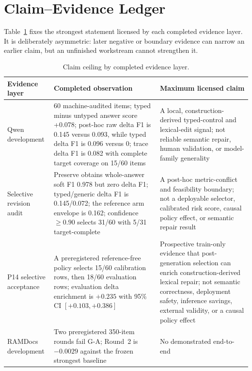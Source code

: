 
\section{Claim--Evidence Ledger}
\label{app:claim-ledger}

Table~\ref{tab:claim-ledger} fixes the strongest statement licensed by each
completed evidence layer. It is deliberately asymmetric: later negative or
boundary evidence can narrow an earlier claim, but an unfinished workstream
cannot strengthen it.

\begin{table}[h]
\caption{Claim ceiling by completed evidence layer.}
\label{tab:claim-ledger}
\begin{center}
\small
\begin{tabular}{p{}p{}p{}}
\toprule
Evidence layer & Completed observation & Maximum licensed claim \\
\midrule
Qwen development & 60 machine-audited items; typed minus untyped answer score
+0.078; post-hoc raw delta F1 is 0.145 versus 0.093, while typed delta F1 is
0.096 versus 0; trace delta F1 is 0.082 with complete target coverage on 15/60
items & A local, construction-derived typed-control and lexical-edit signal;
not reliable semantic repair, human validation, or model-family generality \\
Selective revision audit & Preserve obtains whole-answer soft F1 0.978 but zero
delta F1; typed/generic delta F1 is 0.145/0.072; the reference arm envelope is
0.162; confidence $\geq 0.90$ selects 31/60 with 5/31 target-complete & A
post-hoc metric-conflict and feasibility boundary; not a deployable selector,
calibrated risk score, causal policy effect, or semantic repair result \\
P14 selective acceptance & A preregistered reference-free policy selects 15/60
calibration rows, then 18/60 evaluation rows; evaluation delta enrichment is
$+0.235$ with 95\% CI $[+0.103,+0.386]$ & Prospective train-only evidence that
post-generation selection can enrich construction-derived lexical repair; not
semantic correctness, deployment safety, inference savings, external validity,
or a causal policy effect \\
RAMDocs development & Two preregistered 350-item rounds fail G-A; Round~2 is
$-0.0029$ against the frozen strongest baseline & No demonstrated end-to-end

\end{tabular}
\end{center}
\end{table}
